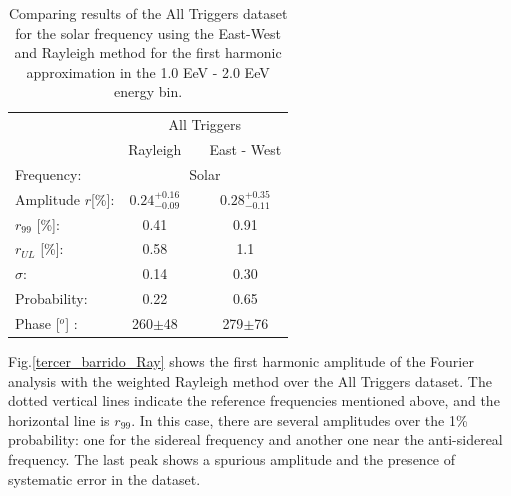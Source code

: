 \documentclass[12pt, doublespace, oneside]{article}
\begin{document}
\begin{table}[H]
    \vspace*{-0.81 cm}
    \begin{small}
        \begin{center}
            \begin{tabular}[c]{l|c|c|c|}
                \cline{2-4}         & \multicolumn{3}{c|}{All Triggers} \\ \cline{2-4}
                                    & Rayleigh   &                   & East - West            \\\hline
\multicolumn{1}{|l|}{Frequency:}       & \multicolumn{3}{c|}{Solar}        \\
\multicolumn{1}{|l|}{Amplitude $r$[\%]:} & $0.24^{+0.16}_{-0.09}$&         & $0.28^{+0.35}_{-0.11}$ \\
\multicolumn{1}{|l|}{$r_{99}$ [\%]:   } & 0.41                  &         & 0.91       \\
\multicolumn{1}{|l|}{$r_{UL}$ [\%]:   } & 0.58                  &        & 1.1       \\
\multicolumn{1}{|l|}{$\sigma$:        } & 0.14                  &         & 0.30          \\\hline
\multicolumn{1}{|l|}{Probability:    } & 0.22                  &          & 0.65          \\
\multicolumn{1}{|l|}{Phase  [$^o$] :           } & 260$\pm$48            &         & 279$\pm$76    \\\hline
            \end{tabular}
        \end{center}
        \vspace*{-0.41 cm}
    \end{small}
    \caption{Comparing results of the All Triggers dataset for the solar frequency using the East-West and Rayleigh method for the first harmonic approximation in the 1.0 EeV - 2.0 EeV energy bin. }
    \label{tab:solar_3}
\end{table}

Fig.\ref{tercer_barrido_Ray} shows the first harmonic amplitude of the Fourier analysis with the weighted Rayleigh method over the All Triggers dataset. The dotted vertical lines indicate the reference frequencies mentioned above, and the horizontal line is $r_{99}$. In this case, there are several amplitudes over the 1\% probability: one for the sidereal frequency and another one near the anti-sidereal frequency. The last peak shows a spurious amplitude and the presence of systematic error in the dataset.
\end{document}
